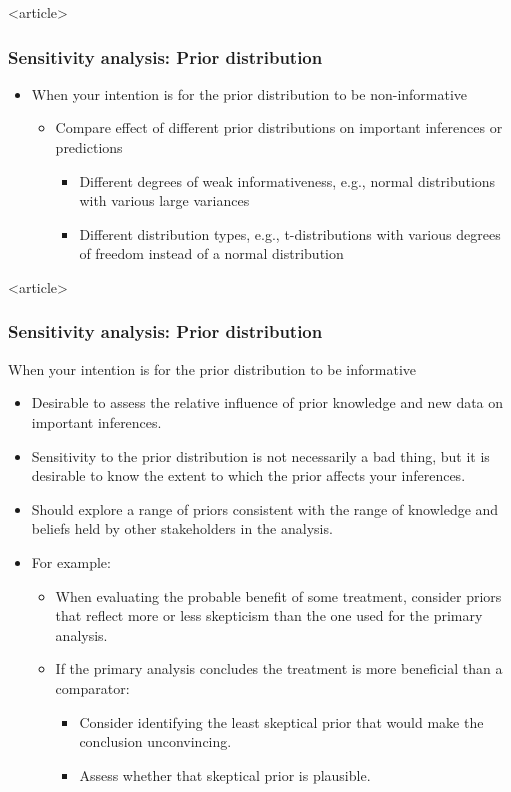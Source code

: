 \documentclass[handout]{beamer}
\begin{document}
\begin{frame}<article>
  \frametitle{Sensitivity analysis: Prior distribution}
  
  \begin{itemize}
  \item When your intention is for the prior distribution to be
    non-informative
    \begin{itemize}
    \item Compare effect of different prior distributions on important
      inferences or predictions
      \begin{itemize}
      \item Different degrees of weak informativeness, e.g., normal
        distributions with various large variances
      \item Different distribution types, e.g., t-distributions with
        various degrees of freedom instead of a normal distribution
      \end{itemize}
    \end{itemize}
  \end{itemize}

\end{frame}

\begin{frame}<article>
  \frametitle{Sensitivity analysis: Prior distribution}
  
  When your intention is for the prior distribution to be informative
  \begin{itemize}
  \item Desirable to assess the relative influence of prior knowledge
    and new data on important inferences.
  \item Sensitivity to the prior distribution is not necessarily a bad
    thing, but it is desirable to know the extent to which the prior
    affects your inferences.
  \item Should explore a range of priors consistent with the range of
    knowledge and beliefs held by other stakeholders in the analysis.
  \item For example:
    \begin{itemize}
    \item When evaluating the probable benefit of some treatment,
      consider priors that reflect more or less skepticism than the
      one used for the primary analysis.
    \item If the primary analysis concludes the treatment is more
      beneficial than a comparator:
      \begin{itemize}
      \item Consider identifying the least skeptical prior that would
        make the conclusion unconvincing.
      \item Assess whether that skeptical prior is plausible.
      \end{itemize}
    \end{itemize}
  \end{itemize}

\end{frame}
\end{document}
